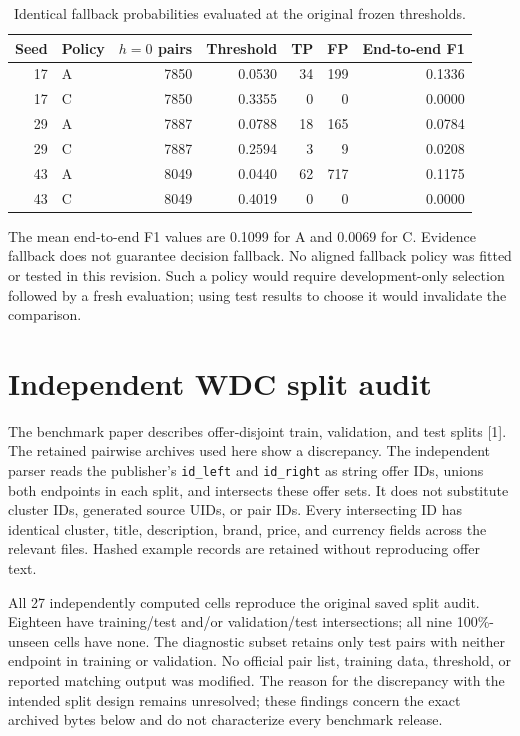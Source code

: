 \documentclass[11pt,letterpaper]{article}
\begin{document}
\begin{table}[htbp]\centering\small\caption{Identical fallback probabilities evaluated at the original frozen thresholds.}
\begin{tabular}{rlrrrrr}
\toprule Seed & Policy & $h=0$ pairs & Threshold & TP & FP & End-to-end F1\\\midrule
17 & A & 7850 & 0.0530 & 34 & 199 & 0.1336\\
17 & C & 7850 & 0.3355 & 0 & 0 & 0.0000\\
29 & A & 7887 & 0.0788 & 18 & 165 & 0.0784\\
29 & C & 7887 & 0.2594 & 3 & 9 & 0.0208\\
43 & A & 8049 & 0.0440 & 62 & 717 & 0.1175\\
43 & C & 8049 & 0.4019 & 0 & 0 & 0.0000\\
\bottomrule\end{tabular}\end{table}


The mean end-to-end F1 values are 0.1099 for A and 0.0069 for C. Evidence fallback does not guarantee decision fallback. No aligned fallback policy was fitted or tested in this revision. Such a policy would require development-only selection followed by a fresh evaluation; using test results to choose it would invalidate the comparison.

\section{Independent WDC split audit}
The benchmark paper describes offer-disjoint train, validation, and test splits [1]. The retained pairwise archives used here show a discrepancy. The independent parser reads the publisher's \texttt{id\_left} and \texttt{id\_right} as string offer IDs, unions both endpoints in each split, and intersects these offer sets. It does not substitute cluster IDs, generated source UIDs, or pair IDs. Every intersecting ID has identical cluster, title, description, brand, price, and currency fields across the relevant files. Hashed example records are retained without reproducing offer text.

All 27 independently computed cells reproduce the original saved split audit. Eighteen have training/test and/or validation/test intersections; all nine 100\%-unseen cells have none. The diagnostic subset retains only test pairs with neither endpoint in training or validation. No official pair list, training data, threshold, or reported matching output was modified. The reason for the discrepancy with the intended split design remains unresolved; these findings concern the exact archived bytes below and do not characterize every benchmark release.
\end{document}
